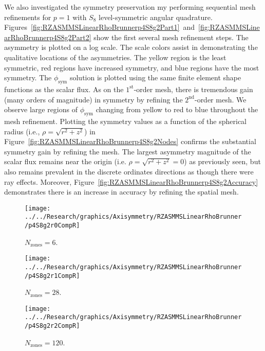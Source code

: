 \documentclass[12pt]{article}
\begin{document}
\FloatBarrier

We also investigated the symmetry preservation my performing sequential mesh refinements for $p=1$ with $S_8$ level-symmetric angular quadrature. Figures~\ref{fig:RZASMMSLinearRhoBrunnerp4S8g2Part1}~and~\ref{fig:RZASMMSLinearRhoBrunnerp4S8g2Part2} show the first several mesh refinement steps. The asymmetry is plotted on a log scale. The scale colors assist in demonstrating the qualitative locations of the asymmetries. The yellow region is the least symmetric, red regions have increased symmetry, and blue regions have the most symmetry. The $\phi_\text{sym}$ solution is plotted using the same finite element shape functions as the scalar flux. As on the $1^\text{st}$-order mesh, there is tremendous gain (many orders of magnitude) in symmetry by refining the $2^\text{nd}$-order mesh. We observe large regions of $\phi_\text{sym}$ changing from yellow to red to blue throughout the mesh refinement. Plotting the symmetry values as a function of the spherical radius (i.e., $\rho=\sqrt{r^2+z^2}$) in Figure~\ref{fig:RZASMMSLinearRhoBrunnerp4S8g2Nodes} confirms the substantial symmetry gain by refining the mesh. The largest asymmetry magnitude of the scalar flux remains near the origin (i.e. $\rho=\sqrt{r^2+z^2}=0$) as previously seen, but also remains prevalent in the discrete ordinates directions as though there were ray effects. Moreover, Figure~\ref{fig:RZASMMSLinearRhoBrunnerp4S8g2Accuracy} demonstrates there is an increase in accuracy by refining the spatial mesh.

\begin{sidewaysfigure}[!htb]
\centering
\begin{subfigure}{0.33\textwidth}
\texttt{[image: ../../Research/graphics/Axisymmetry/RZASMMSLinearRhoBrunner/p4S8g2r0CompR]}
\caption{$N_\text{zones}=6$.}
\end{subfigure}%
\begin{subfigure}{0.33\textwidth}
\texttt{[image: ../../Research/graphics/Axisymmetry/RZASMMSLinearRhoBrunner/p4S8g2r1CompR]}
\caption{$N_\text{zones}=28$.}
\end{subfigure}%
\begin{subfigure}{0.33\textwidth}
\texttt{[image: ../../Research/graphics/Axisymmetry/RZASMMSLinearRhoBrunner/p4S8g2r2CompR]}
\caption{$N_\text{zones}=120$.}
\end{subfigure}
\caption{Relative asymmetry for $p=4$ finite elements on a $2^\text{nd}$-order mesh for $S_8$ level-symmetric angular quadrature.}
\label{fig:RZASMMSLinearRhoBrunnerp4S8g2Part1}
\end{sidewaysfigure}
\end{document}
